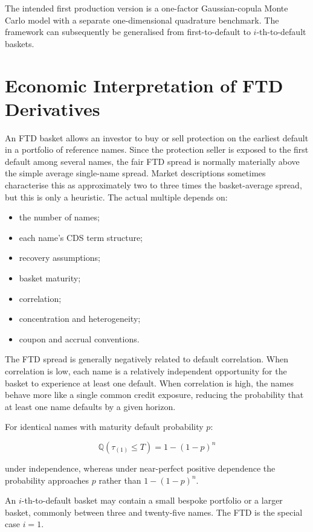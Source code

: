 \documentclass[11pt,a4paper]{article}
\newcommand{\Q}{\mathbb{Q}}
\begin{document}
The intended first production version is a one-factor Gaussian-copula Monte Carlo model with a separate one-dimensional quadrature benchmark. The framework can subsequently be generalised from first-to-default to $i$-th-to-default baskets.

\section{Economic Interpretation of FTD Derivatives}

An FTD basket allows an investor to buy or sell protection on the earliest default in a portfolio of reference names. Since the protection seller is exposed to the first default among several names, the fair FTD spread is normally materially above the simple average single-name spread. Market descriptions sometimes characterise this as approximately two to three times the basket-average spread, but this is only a heuristic. The actual multiple depends on:

\begin{itemize}
    \item the number of names;
    \item each name's CDS term structure;
    \item recovery assumptions;
    \item basket maturity;
    \item correlation;
    \item concentration and heterogeneity;
    \item coupon and accrual conventions.
\end{itemize}

The FTD spread is generally negatively related to default correlation. When correlation is low, each name is a relatively independent opportunity for the basket to experience at least one default. When correlation is high, the names behave more like a single common credit exposure, reducing the probability that at least one name defaults by a given horizon.

For identical names with maturity default probability $p$:

\[
\Q(\tau_{(1)} \leq T)=1-(1-p)^n
\]

under independence, whereas under near-perfect positive dependence the probability approaches $p$ rather than $1-(1-p)^n$.

An $i$-th-to-default basket may contain a small bespoke portfolio or a larger basket, commonly between three and twenty-five names. The FTD is the special case $i=1$.
\end{document}
